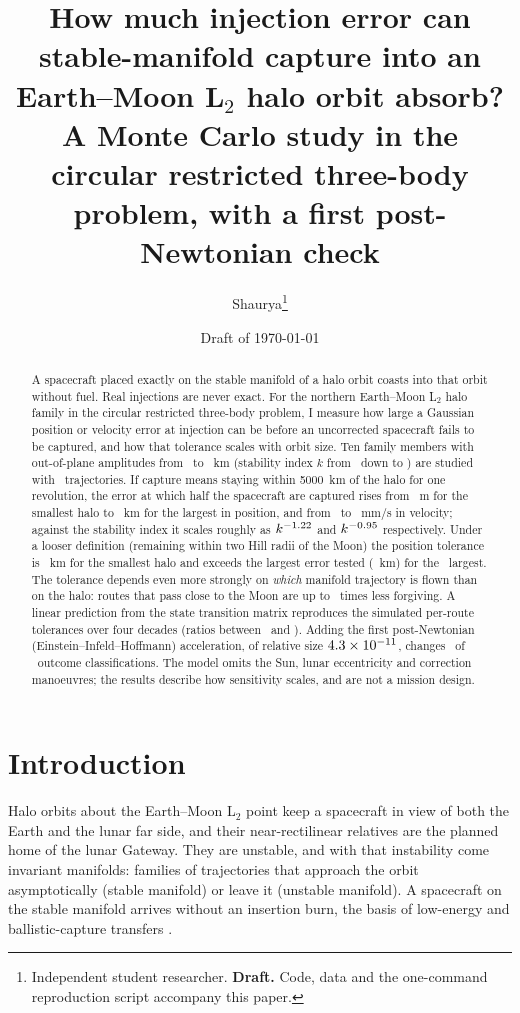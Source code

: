 \documentclass[11pt,a4paper]{article}
\title{How much injection error can stable-manifold capture into an Earth--Moon L$_2$ halo orbit absorb?\\[4pt]
\large A Monte Carlo study in the circular restricted three-body problem, with a first post-Newtonian check}
\author{Shaurya\thanks{Independent student researcher. \textbf{Draft.} Code, data and the one-command reproduction script accompany this paper.}}
\date{Draft of \today}
\begin{document}
\maketitle

\begin{abstract}
\noindent A spacecraft placed exactly on the stable manifold of a halo orbit coasts into that orbit without
fuel. Real injections are never exact. For the northern Earth--Moon L$_2$ halo family in the circular
restricted three-body problem, I measure how large a Gaussian position or velocity error at injection can be
before an uncorrected spacecraft fails to be captured, and how that tolerance scales with orbit size.
Ten family members with out-of-plane amplitudes from \AzMin\ to \AzMax~km (stability index $k$ from \KMax\ down to \KMin) are studied with
\NTrajTotal\ trajectories. If capture means staying within 5000~km of the halo for one revolution, the
error at which half the spacecraft are captured rises from \SposAFirst~m for the smallest halo to \SposALastKm~km for the largest in position, and from
\SvelAFirst\ to \SvelALast~mm/s in velocity; against the stability index it scales roughly as $k^{-1.22}$ and $k^{-0.95}$ respectively.
Under a looser definition (remaining within two Hill radii of the Moon) the position tolerance is
\SposBFirst~km for the smallest halo and exceeds the largest error tested (\SigMaxKm~km) for the \NBOutOfRange\ largest.
The tolerance depends even more strongly on \emph{which} manifold trajectory is flown than on the halo:
routes that pass close to the Moon are up to \RouteSpreadMax\ times less forgiving. A linear prediction from the state transition matrix
reproduces the simulated per-route tolerances over four decades (ratios between \RouteLinMin\ and \RouteLinMax). Adding the first post-Newtonian (Einstein--Infeld--Hoffmann)
acceleration, of relative size \(4.3\times10^{-11}\), changes \PNFlips\ of \PNTotal\ outcome classifications. The model omits the Sun, lunar
eccentricity and correction manoeuvres; the results describe how sensitivity scales, and are not a mission design.
\end{abstract}

\section{Introduction}
Halo orbits about the Earth--Moon L$_2$ point keep a spacecraft in view of both the Earth and the lunar far
side, and their near-rectilinear relatives are the planned home of the lunar Gateway. They are unstable, and
with that instability come invariant manifolds: families of trajectories that approach the orbit
asymptotically (stable manifold) or leave it (unstable manifold). A spacecraft on the stable manifold arrives
without an insertion burn, the basis of low-energy and ballistic-capture transfers \cite{koon}.
\end{document}
